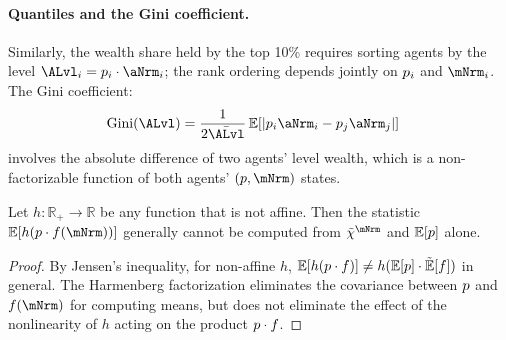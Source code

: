 \documentclass[\econtexRoot/BufferStockTheory]{subfiles}
\begin{document}
\paragraph{Quantiles and the Gini coefficient.}
Similarly, the wealth share held by the top 10\% requires sorting agents by the level $\ALvl_i = \permLvlPrb_i \cdot \aNrm_i$; the rank ordering depends jointly on $p_i$ and $\mNrm_i$. The Gini coefficient:
\begin{equation}\begin{gathered}\begin{aligned} \label{eq:GiniA}
\textup{Gini}(\ALvl) & = \frac{1}{2\bar{\ALvl}} \, \mathbb{E}\!\left[|\permLvlPrb_i \aNrm_i - \permLvlPrb_j \aNrm_j|\right]
\end{aligned}\end{gathered}\end{equation}
involves the absolute difference of two agents' level wealth, which is a non-factorizable function of both agents' $(\permLvlPrb, \mNrm)$ states.

\begin{claim}\label{claim:NonAffine}
Let $h:\mathbb{R}_{+} \to \mathbb{R}$ be any function that is not affine. Then the statistic $\mathbb{E}[h(\permLvlPrb \cdot f(\mNrm))]$ generally cannot be computed from $\mpPrbMargWgt$ and $\mathbb{E}[p]$ alone.
\end{claim}
\begin{proof}
By Jensen's inequality, for non-affine $h$, $\mathbb{E}[h(p \cdot f)] \neq h(\mathbb{E}[p] \cdot \tilde{\mathbb{E}}[f])$ in general. The Harmenberg factorization eliminates the covariance between $p$ and $f(\mNrm)$ for computing means, but does not eliminate the effect of the nonlinearity of $h$ acting on the product $p \cdot f$.
\end{proof}
\end{document}
